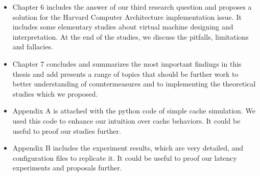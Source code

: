 \begin{itemize}
	\item Chapter 6 includes the answer of our third research question and proposes a solution for the Harvard Computer Architecture implementation issue. It includes some elementary studies about virtual machine designing and interpretation. At the end of the studies, we discuss the pitfalls, limitations and fallacies.
	\item Chapter 7 concludes and summarizes the most important findings in this thesis and add presents a range of topics that should be further work to better understanding of countermeasures and to implementing the theoretical studies which we proposed. 
	\item Appendix A is attached with the python code of simple cache simulation. We used this code to enhance our intuition over cache behaviors. It could be useful to proof our studies further.
	\item Appendix B includes the experiment results, which are very detailed, and configuration files to replicate it. It could be useful to proof our latency experiments and proposals further.
\end{itemize}

